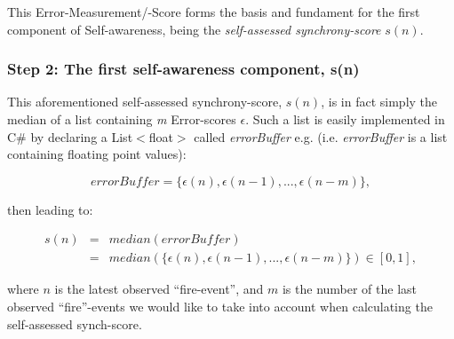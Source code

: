 	
	This Error-Measurement/-Score forms the basis and fundament for the first component of Self-awareness, being the \textit{self-assessed synchrony-score} $s(n)$.
	
	\subsubsection{Step 2: The first self-awareness component, s(n)}
	This aforementioned self-assessed synchrony-score, $s(n)$, is in fact simply the median of a list containing \textit{m} Error-scores $\epsilon$. Such a list is easily implemented in C\# by declaring a List$<$float$>$ called \textit{errorBuffer} e.g. (i.e. \textit{errorBuffer} is a list containing floating point values):
	
	\begin{equation}
	\label{error_buffer}
		errorBuffer = \{\epsilon(n), \epsilon(n-1), ... , \epsilon(n-m)\},
	\end{equation} \nl
	
	then leading to:
	
	\begin{equation}
	\label{self_assessed_synch}
		\begin{array}{rrclcl}
		s(n) & = & median(errorBuffer) \\ 
		& = & median(\{\epsilon(n), \epsilon(n-1), ... , \epsilon(n-m)\}) \in [0, 1],
		\end{array}
	\end{equation} \nl
	
	where $n$ is the latest observed ``fire-event'', and $m$ is the number of the last observed ``fire''-events we would like to take into account when calculating the self-assessed synch-score.
	
